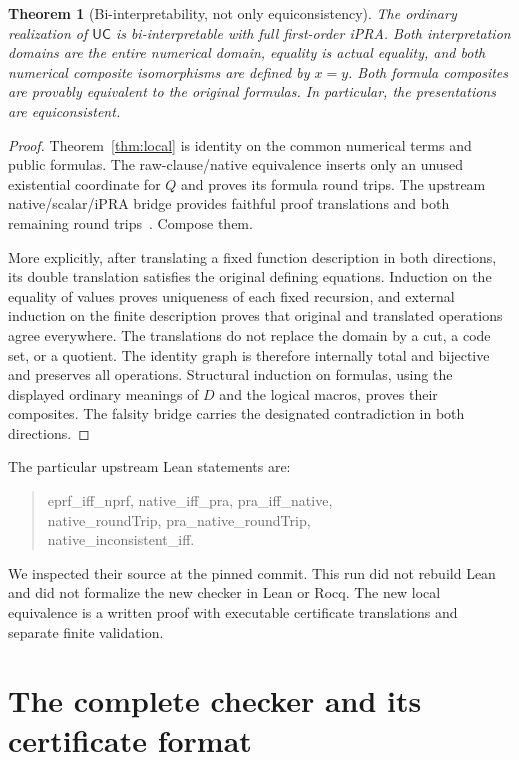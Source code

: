 \documentclass[11pt,letterpaper]{article}
\newtheorem{theorem}{Theorem}[section]
\theoremstyle{definition}\newtheorem{definition}[theorem]{Definition}
\newcommand{\UC}{\mathsf{UC}}
\begin{document}
\begin{theorem}[Bi-interpretability, not only equiconsistency]
\label{thm:bi}
The ordinary realization of $\UC$ is bi-interpretable with full
first-order iPRA. Both interpretation domains are the entire numerical
domain, equality is actual equality, and both numerical composite
isomorphisms are defined by $x=y$. Both formula composites are provably
equivalent to the original formulas. In particular, the presentations
are equiconsistent.
\end{theorem}
\begin{proof}
Theorem~\ref{thm:local} is identity on the common numerical terms and
public formulas. The raw-clause/native equivalence inserts only an unused
existential coordinate for $Q$ and proves its formula round trips.
The upstream native/scalar/iPRA bridge provides faithful proof translations
and both remaining round trips~\cite{bridge}. Compose them.

More explicitly, after translating a fixed function description in both
directions, its double translation satisfies the original defining
equations. Induction on the equality of values proves uniqueness of each
fixed recursion, and external induction on the finite description proves
that original and translated operations agree everywhere. The translations
do not replace the domain by a cut, a code set, or a quotient. The identity
graph is therefore internally total and bijective and preserves all
operations. Structural induction on formulas, using the displayed ordinary
meanings of $D$ and the logical macros, proves their composites. The
falsity bridge carries the designated contradiction in both directions.
\end{proof}

The particular upstream Lean statements are:
\begin{quote}\small\ttfamily
eprf\_iff\_nprf, native\_iff\_pra, pra\_iff\_native,\\
native\_roundTrip, pra\_native\_roundTrip,\\
native\_inconsistent\_iff.
\end{quote}
We inspected their source at the pinned commit. This run did not rebuild Lean and did not formalize the new
checker in Lean or Rocq. The new local equivalence is a written proof with
executable certificate translations and separate finite validation.

\section{The complete checker and its certificate format}
\end{document}
